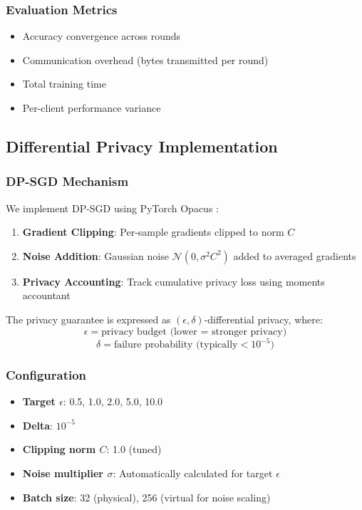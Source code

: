 \documentclass[conference]{IEEEtran}
\begin{document}
\subsubsection{Evaluation Metrics}

\begin{itemize}
    \item Accuracy convergence across rounds
    \item Communication overhead (bytes transmitted per round)
    \item Total training time
    \item Per-client performance variance
\end{itemize}

\subsection{Differential Privacy Implementation}

\subsubsection{DP-SGD Mechanism}

We implement DP-SGD using PyTorch Opacus \cite{yousefpour2021opacus}:

\begin{enumerate}
    \item \textbf{Gradient Clipping}: Per-sample gradients clipped to norm $C$
    \item \textbf{Noise Addition}: Gaussian noise $\mathcal{N}(0, \sigma^2 C^2)$ added to averaged gradients
    \item \textbf{Privacy Accounting}: Track cumulative privacy loss using moments accountant
\end{enumerate}

The privacy guarantee is expressed as $(\epsilon, \delta)$-differential privacy, where:
\begin{equation}
\epsilon = \text{privacy budget (lower = stronger privacy)}
\end{equation}
\begin{equation}
\delta = \text{failure probability (typically} < 10^{-5})
\end{equation}

\subsubsection{Configuration}

\begin{itemize}
    \item \textbf{Target $\epsilon$}: 0.5, 1.0, 2.0, 5.0, 10.0
    \item \textbf{Delta}: $10^{-5}$
    \item \textbf{Clipping norm $C$}: 1.0 (tuned)
    \item \textbf{Noise multiplier $\sigma$}: Automatically calculated for target $\epsilon$
    \item \textbf{Batch size}: 32 (physical), 256 (virtual for noise scaling)
\end{itemize}
\end{document}

